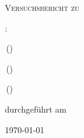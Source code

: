 
\makeatletter
\newcommand*{\protokollemailparse}[1]{%
	\@for\@tempa:=#1\do{%
		\normalsize\email{\@tempa}\\
	}%
}
\makeatother

\begin{titlepage}
	\centering
	{\scshape\LARGE Versuchsbericht zu \par}
	\vspace{1cm}
	{\scshape\huge \varNum {}: \varName\par}
	\vspace{2.5cm}
	{\LARGE \varGruppe\par}
	\vspace{0.5cm}
	{\large \varNameA \,(\email{\varEmailA}) \par}
	{\large \varNameB \,(\email{\varEmailB}) \par}
	{\large \varNameC \,(\email{\varEmailC}) \par}
	\vfill
	durchgeführt am \varDatum\par
	{\large \varBetreuer} 
	\vfill	
	{\large \today\par}
\end{titlepage}


\maketitle
